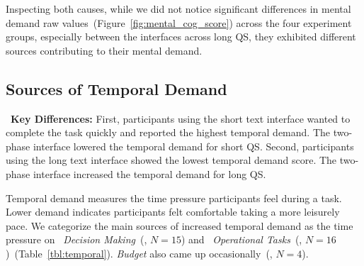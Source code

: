 Inspecting both causes, while we did not notice significant differences in mental demand raw values~(Figure~\ref{fig:mental_cog_score}) across the four experiment groups, especially between the interfaces across long QS, they exhibited different sources contributing to their mental demand.




\subsection{Sources of Temporal Demand} 
\label{sec:temporal}

\begin{tldrbox}
   \faKey~\textbf{Key Differences:} %
    First, participants using the short text interface wanted to complete the task quickly and reported the highest temporal demand. The two-phase interface lowered the temporal demand for short QS. Second, participants using the long text interface showed the lowest temporal demand score. The two-phase interface increased the temporal demand for long QS.
\end{tldrbox}

Temporal demand measures the time pressure participants feel during a task. Lower demand indicates participants felt comfortable taking a more leisurely pace. We categorize the main sources of increased temporal demand as the time pressure on ~\textit{Decision Making}~(, $N=15$) and ~\textit{Operational Tasks}~(, $N=16$)~(Table~\ref{tbl:temporal}). \textit{Budget} also came up occasionally~(, $N=4$).

